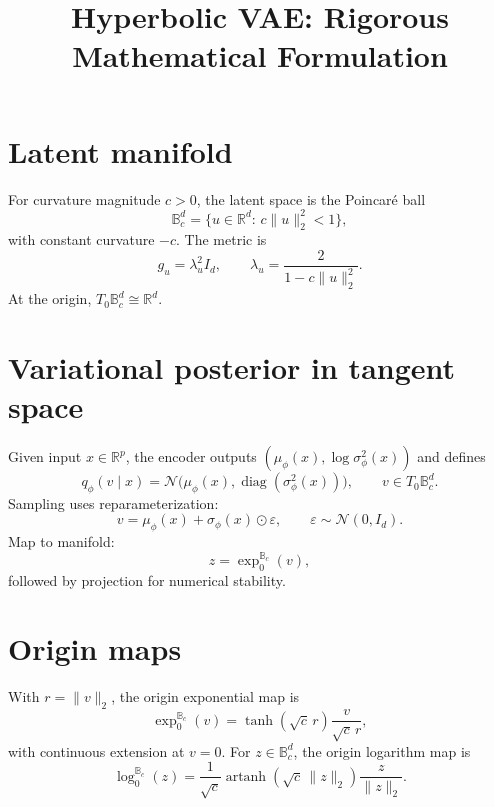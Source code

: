 \documentclass[11pt]{article}
\title{Hyperbolic VAE: Rigorous Mathematical Formulation}
\date{}
\begin{document}
\maketitle

\section{Latent manifold}
For curvature magnitude $c>0$, the latent space is the Poincar\'e ball
\begin{equation}
\mathbb B_c^d=\{u\in\mathbb R^d:\,c\|u\|_2^2<1\},
\end{equation}
with constant curvature $-c$. The metric is
\begin{equation}
g_u=\lambda_u^2 I_d,
\qquad
\lambda_u=\frac{2}{1-c\|u\|_2^2}.
\end{equation}
At the origin, $T_0\mathbb B_c^d\cong\mathbb R^d$.

\section{Variational posterior in tangent space}
Given input $x\in\mathbb R^p$, the encoder outputs $(\mu_\phi(x),\log\sigma_\phi^2(x))$ and defines
\begin{equation}
q_\phi(v\mid x)=\mathcal N\big(\mu_\phi(x),\operatorname{diag}(\sigma_\phi^2(x))\big),
\qquad v\in T_0\mathbb B_c^d.
\end{equation}
Sampling uses reparameterization:
\begin{equation}
v=\mu_\phi(x)+\sigma_\phi(x)\odot\varepsilon,
\qquad \varepsilon\sim\mathcal N(0,I_d).
\end{equation}
Map to manifold:
\begin{equation}
z=\exp_0^{\mathbb B_c}(v),
\end{equation}
followed by projection for numerical stability.

\section{Origin maps}
With $r=\|v\|_2$, the origin exponential map is
\begin{equation}
\exp_0^{\mathbb B_c}(v)=\tanh(\sqrt c\,r)\frac{v}{\sqrt c\,r},
\end{equation}
with continuous extension at $v=0$. For $z\in\mathbb B_c^d$, the origin logarithm map is
\begin{equation}
\log_0^{\mathbb B_c}(z)
=\frac{1}{\sqrt c}\operatorname{artanh}(\sqrt c\,\|z\|_2)\frac{z}{\|z\|_2}.
\end{equation}
\end{document}
